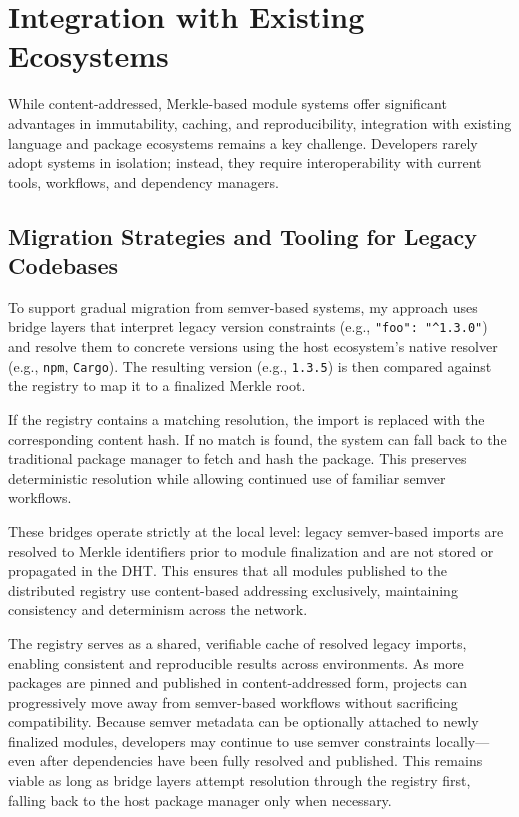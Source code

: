 \documentclass[sigplan,screen]{acmart}
\begin{document}
\section{Integration with Existing Ecosystems}
\label{sec:integation-existing-ecosystems}

While content-addressed, Merkle-based module systems offer significant advantages in immutability, caching, and reproducibility, integration with existing language and package ecosystems remains a key challenge. Developers rarely adopt systems in isolation; instead, they require interoperability with current tools, workflows, and dependency managers.

\subsection{Migration Strategies and Tooling for Legacy Codebases}
\label{sec:migration-strategies}

To support gradual migration from semver-based systems, my approach uses bridge layers that interpret legacy version constraints (e.g., \verb#"foo": "^1.3.0"#) and resolve them to concrete versions using the host ecosystem's native resolver (e.g., \texttt{npm}, \texttt{Cargo}). The resulting version (e.g., \texttt{1.3.5}) is then compared against the registry to map it to a finalized Merkle root.

If the registry contains a matching resolution, the import is replaced with the corresponding content hash. If no match is found, the system can fall back to the traditional package manager to fetch and hash the package. This preserves deterministic resolution while allowing continued use of familiar semver workflows.

These bridges operate strictly at the local level: legacy semver-based imports are resolved to Merkle identifiers prior to module finalization and are not stored or propagated in the DHT. This ensures that all modules published to the distributed registry use content-based addressing exclusively, maintaining consistency and determinism across the network.

The registry serves as a shared, verifiable cache of resolved legacy imports, enabling consistent and reproducible results across environments. As more packages are pinned and published in content-addressed form, projects can progressively move away from semver-based workflows without sacrificing compatibility. Because semver metadata can be optionally attached to newly finalized modules, developers may continue to use semver constraints locally—even after dependencies have been fully resolved and published. This remains viable as long as bridge layers attempt resolution through the registry first, falling back to the host package manager only when necessary.
\end{document}
